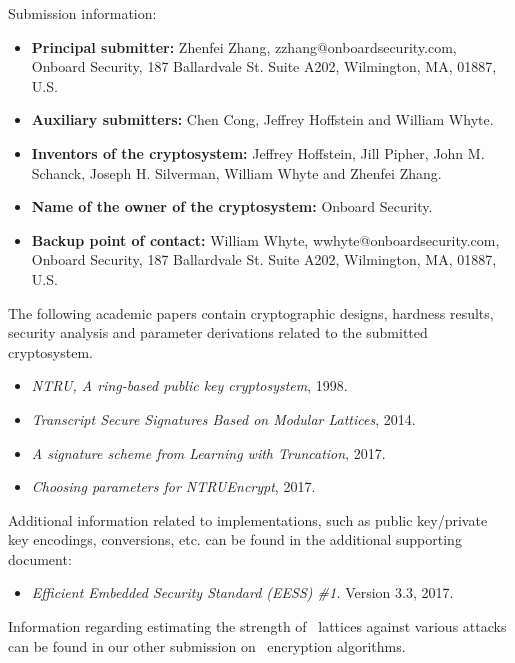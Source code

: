 \documentclass{llncs}
\newcommand{\ntru}{{\sf{NTRU}}}
\newcommand{\<}{\langle}
\renewcommand{\>}{\rangle}
\begin{document}
\noindent
Submission information:
\begin{itemize}
\item {\bf Principal submitter:} Zhenfei Zhang, zzhang@onboardsecurity.com, Onboard Security, 187 Ballardvale St. Suite A202, Wilmington, MA, 01887, U.S.
\item {\bf Auxiliary submitters:}
Chen Cong, Jeffrey Hoffstein and William Whyte.
\item {\bf 
Inventors of the cryptosystem:} Jeffrey Hoffstein,
               Jill Pipher,
               John M. Schanck,
               Joseph H. Silverman,
               William Whyte and
               Zhenfei Zhang.
\item {\bf Name of the owner of the cryptosystem:} 
Onboard Security.      

\item {\bf Backup point of contact:} William Whyte, wwhyte@onboardsecurity.com, Onboard Security, 187 Ballardvale St. Suite A202, Wilmington, MA, 01887, U.S.
     
\end{itemize}

The following academic papers contain
cryptographic designs, 
hardness results,
security analysis and parameter derivations 
related to the submitted cryptosystem.

\begin{itemize}
\item {\em NTRU, A ring-based public key cryptosystem}, 1998.
\item {\em Transcript Secure Signatures Based on Modular Lattices}, 2014.
\item {\em A signature scheme from Learning with Truncation}, 2017.
\item {\em Choosing parameters for NTRUEncrypt}, 2017.

\end{itemize}


Additional information related to implementations, such as public key/private key encodings, 
conversions, etc. can be found in the additional supporting document:

\begin{itemize}
\item {\em Efficient Embedded Security Standard (EESS) \#1.} Version 3.3, 2017.
\end{itemize}

Information regarding estimating the strength of \ntru~lattices against various attacks can be found in 
our other submission on \ntru~encryption algorithms.
\end{document}
